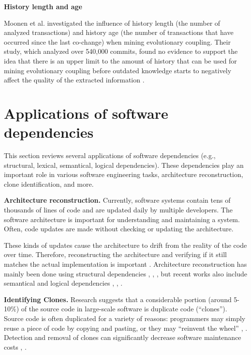 \textbf{History length and age}

Moonen et al. investigated the influence of history length (the number of analyzed transactions) and history age (the number of transactions that have occurred since the last co-change) when mining evolutionary coupling. Their study, which analyzed over 540,000 commits, found no evidence to support the idea that there is an upper limit to the amount of history that can be used for mining evolutionary coupling before outdated knowledge starts to negatively affect the quality of the extracted information \cite{article-Moonen}.


\section{Applications of software dependencies}
\label{app}

\hspace{4em}This section reviews several applications of software dependencies (e.g., structural, lexical, semantical, logical dependencies). These dependencies play an important role in various software engineering tasks, architecture reconstruction, clone identification, and more. 


\textbf{Architecture reconstruction.}
Currently, software systems contain tens of thousands of lines of code and are updated daily by multiple developers. The software architecture is important for understanding and maintaining a system. Often, code updates are made without checking or updating the architecture.

These kinds of updates cause the architecture to drift from the reality of the code over time. Therefore, reconstructing the architecture and verifying if it still matches the actual implementation is important \cite{RecoverySartipi, model-bennett, Kalliamvakou2016}. Architecture reconstruction has mainly been done using structural dependencies \cite{sar}, \cite{PagerankENASE}, \cite{Bass-archreconstruction}, but recent works also include semantical and logical dependencies \cite{lexical-dep}, \cite{corazza2}, \cite{maletic}.

\textbf{Identifying Clones.} 
Research suggests that a considerable portion (around 5-10\%) of the source code in large-scale software is duplicate code (“clones”). Source code is often duplicated for a variety of reasons: programmers may simply reuse a piece of code by copying and pasting, or they may “reinvent the wheel” \cite{ClonesMayrand}, \cite{clones}. Detection and removal of clones can significantly decrease software maintenance costs \cite{CloneDetection}, \cite{cloneKamiya}.

